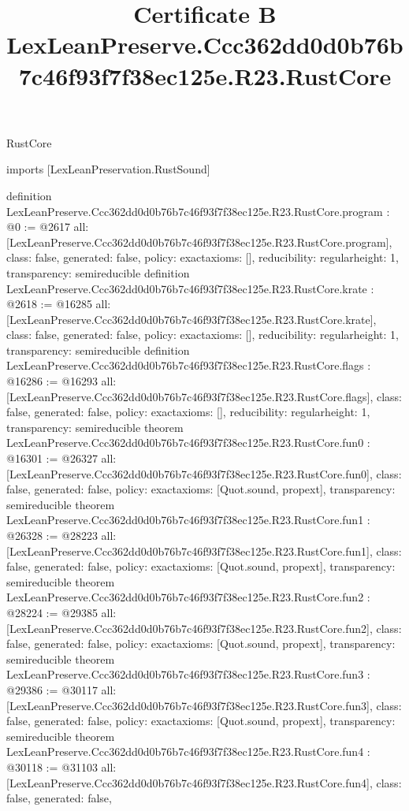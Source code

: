 \begin{lexlean}{RustCore}
\title{Certificate B LexLeanPreserve.Ccc362dd0d0b76b7c46f93f7f38ec125e.R23.RustCore}
\begin{coremodule}
imports [LexLeanPreservation.RustSound]

definition LexLeanPreserve.Ccc362dd0d0b76b7c46f93f7f38ec125e.R23.RustCore.program : @0 := @2617 {
  all: [LexLeanPreserve.Ccc362dd0d0b76b7c46f93f7f38ec125e.R23.RustCore.program],
  class: false,
  generated: false,
  policy: exact{axioms: []},
  reducibility: regular{height: 1},
  transparency: semireducible
}
definition LexLeanPreserve.Ccc362dd0d0b76b7c46f93f7f38ec125e.R23.RustCore.krate : @2618 := @16285 {
  all: [LexLeanPreserve.Ccc362dd0d0b76b7c46f93f7f38ec125e.R23.RustCore.krate],
  class: false,
  generated: false,
  policy: exact{axioms: []},
  reducibility: regular{height: 1},
  transparency: semireducible
}
definition LexLeanPreserve.Ccc362dd0d0b76b7c46f93f7f38ec125e.R23.RustCore.flags : @16286 := @16293 {
  all: [LexLeanPreserve.Ccc362dd0d0b76b7c46f93f7f38ec125e.R23.RustCore.flags],
  class: false,
  generated: false,
  policy: exact{axioms: []},
  reducibility: regular{height: 1},
  transparency: semireducible
}
theorem LexLeanPreserve.Ccc362dd0d0b76b7c46f93f7f38ec125e.R23.RustCore.fun0 : @16301 := @26327 {
  all: [LexLeanPreserve.Ccc362dd0d0b76b7c46f93f7f38ec125e.R23.RustCore.fun0],
  class: false,
  generated: false,
  policy: exact{axioms: [Quot.sound, propext]},
  transparency: semireducible
}
theorem LexLeanPreserve.Ccc362dd0d0b76b7c46f93f7f38ec125e.R23.RustCore.fun1 : @26328 := @28223 {
  all: [LexLeanPreserve.Ccc362dd0d0b76b7c46f93f7f38ec125e.R23.RustCore.fun1],
  class: false,
  generated: false,
  policy: exact{axioms: [Quot.sound, propext]},
  transparency: semireducible
}
theorem LexLeanPreserve.Ccc362dd0d0b76b7c46f93f7f38ec125e.R23.RustCore.fun2 : @28224 := @29385 {
  all: [LexLeanPreserve.Ccc362dd0d0b76b7c46f93f7f38ec125e.R23.RustCore.fun2],
  class: false,
  generated: false,
  policy: exact{axioms: [Quot.sound, propext]},
  transparency: semireducible
}
theorem LexLeanPreserve.Ccc362dd0d0b76b7c46f93f7f38ec125e.R23.RustCore.fun3 : @29386 := @30117 {
  all: [LexLeanPreserve.Ccc362dd0d0b76b7c46f93f7f38ec125e.R23.RustCore.fun3],
  class: false,
  generated: false,
  policy: exact{axioms: [Quot.sound, propext]},
  transparency: semireducible
}
theorem LexLeanPreserve.Ccc362dd0d0b76b7c46f93f7f38ec125e.R23.RustCore.fun4 : @30118 := @31103 {
  all: [LexLeanPreserve.Ccc362dd0d0b76b7c46f93f7f38ec125e.R23.RustCore.fun4],
  class: false,
  generated: false,
}
\end{coremodule}
\end{lexlean}
